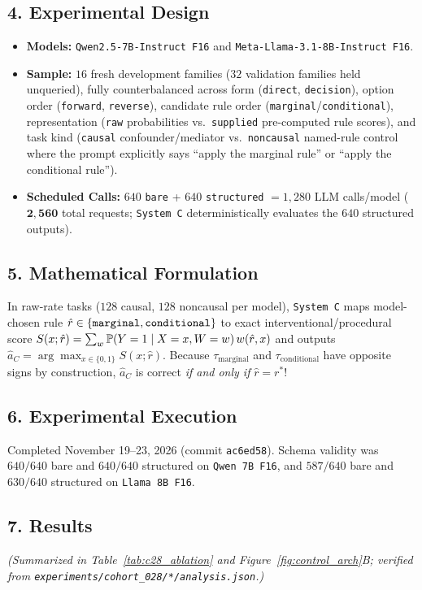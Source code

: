 \subsection*{4. Experimental Design}
\begin{itemize}
  \item \textbf{Models:} \texttt{Qwen2.5-7B-Instruct F16} and \texttt{Meta-Llama-3.1-8B-Instruct F16}.
  \item \textbf{Sample:} $16$ fresh development families ($32$ validation families held unqueried), fully counterbalanced across form (\texttt{direct}, \texttt{decision}), option order (\texttt{forward}, \texttt{reverse}), candidate rule order (\texttt{marginal}/\texttt{conditional}), representation (\texttt{raw} probabilities vs.\ \texttt{supplied} pre-computed rule scores), and task kind (\texttt{causal} confounder/mediator vs.\ \texttt{noncausal} named-rule control where the prompt explicitly says ``apply the marginal rule'' or ``apply the conditional rule'').
  \item \textbf{Scheduled Calls:} $640$ \texttt{bare} + $640$ \texttt{structured} $= 1{,}280$ LLM calls/model ($\mathbf{2{,}560}$ total requests; \texttt{System C} deterministically evaluates the $640$ structured outputs).
\end{itemize}

\subsection*{5. Mathematical Formulation}
In raw-rate tasks ($128$ causal, $128$ noncausal per model), \texttt{System C} maps model-chosen rule $\hat{r} \in \{\text{\texttt{marginal}}, \text{\texttt{conditional}}\}$ to exact interventional/procedural score $S(x; \hat{r}) = \sum_w \mathbb{P}(Y=1\mid X=x,W=w)\,w(\hat{r}, x)$ and outputs $\hat{a}_C = \arg\max_{x\in\{0,1\}} S(x; \hat{r})$. Because $\tau_{\mathrm{marginal}}$ and $\tau_{\mathrm{conditional}}$ have opposite signs by construction, $\hat{a}_C$ is correct \emph{if and only if} $\hat{r} = r^*$!

\subsection*{6. Experimental Execution}
Completed November 19--23, 2026 (commit \texttt{ac6ed58}). Schema validity was $640/640$ bare and $640/640$ structured on \texttt{Qwen 7B F16}, and $587/640$ bare and $630/640$ structured on \texttt{Llama 8B F16}.

\subsection*{7. Results}
\emph{(Summarized in Table~\ref{tab:c28_ablation} and Figure~\ref{fig:control_arch}B; verified from \texttt{experiments/cohort\_028/*/analysis.json}.)}

